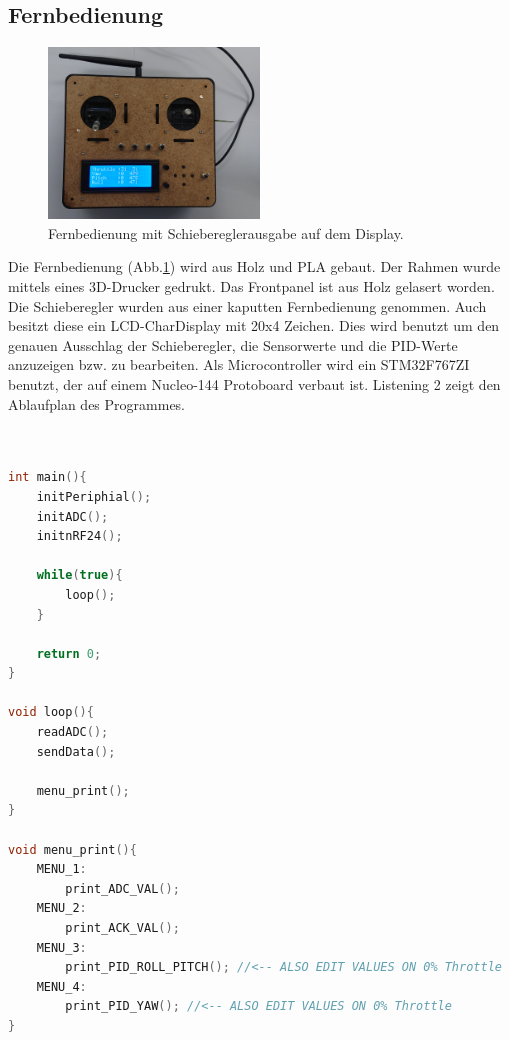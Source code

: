 \documentclass[12pt,a4paper, ngerman]{article}
\begin{document}
\subsection{Fernbedienung}
\begin{figure}
\centering
\includegraphics[width=0.5\textwidth]{Ferni.JPG}
\caption[Eigenes Bild]{Fernbedienung mit Schiebereglerausgabe auf dem Display.} \label{ferni}
\end{figure}
Die Fernbedienung (Abb.\ref{ferni}) wird aus Holz und PLA gebaut. Der Rahmen wurde mittels eines 3D-Drucker gedrukt. Das Frontpanel ist aus Holz gelasert worden. Die Schieberegler wurden aus einer kaputten Fernbedienung genommen. Auch besitzt diese ein LCD-CharDisplay mit 20x4 Zeichen. Dies wird benutzt um den genauen Ausschlag der Schieberegler, die Sensorwerte und die PID-Werte anzuzeigen bzw. zu bearbeiten. Als Microcontroller wird ein STM32F767ZI benutzt, der auf einem Nucleo-144 Protoboard verbaut ist. Listening 2 zeigt den Ablaufplan des Programmes.\\ \\ \\
\begin{lstlisting}[language=C++,caption=Programmablauf Pseudocode]
int main(){
	initPeriphial();
	initADC();
	initnRF24();

	while(true){
		loop();
	}
	
	return 0;
}

void loop(){
	readADC();
	sendData();
	
	menu_print();
}

void menu_print(){
	MENU_1:
		print_ADC_VAL();
	MENU_2:
		print_ACK_VAL();
	MENU_3:
		print_PID_ROLL_PITCH(); //<-- ALSO EDIT VALUES ON 0% Throttle
	MENU_4:
		print_PID_YAW(); //<-- ALSO EDIT VALUES ON 0% Throttle
}


\end{lstlisting}
\newpage
\end{document}
